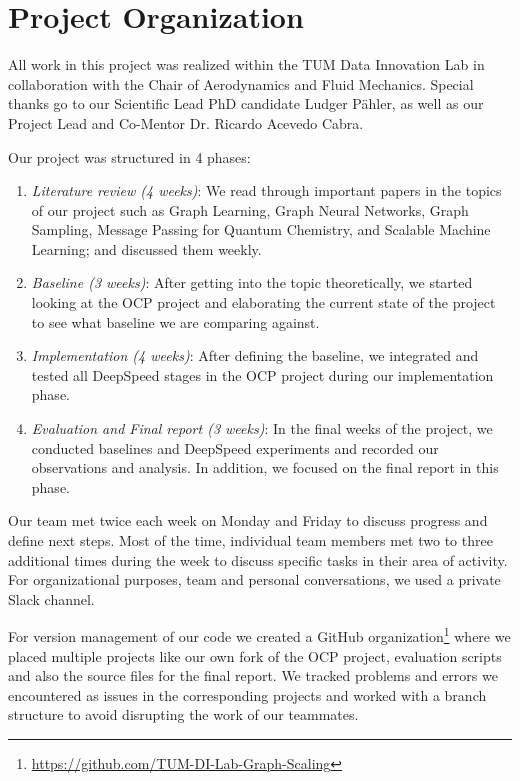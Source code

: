 \section{Project Organization}
\label{section:project_organization}

All work in this project was realized within the TUM Data Innovation Lab in collaboration with the Chair of 
Aerodynamics and Fluid Mechanics. Special thanks go to our Scientific Lead PhD candidate Ludger P\"ahler, 
as well as our Project Lead and Co-Mentor Dr. Ricardo Acevedo Cabra.

Our project was structured in 4 phases:

\begin{enumerate}
    \item \textit{Literature review (4 weeks)}: We read through important papers in the topics of our project such 
    as Graph Learning, Graph Neural Networks, Graph Sampling, Message Passing for Quantum Chemistry, 
    and Scalable Machine Learning; and discussed them weekly.
    \item \textit{Baseline (3 weeks)}: After getting into the topic theoretically, we started looking at the OCP 
    project and elaborating the current state of the project to see what baseline we are comparing against.
    \item \textit{Implementation (4 weeks)}: After defining the baseline, we integrated and tested all DeepSpeed 
    stages in the OCP project during our implementation phase.
    \item \textit{Evaluation and Final report (3 weeks)}: In the final weeks of the project, we conducted baselines 
    and DeepSpeed experiments and recorded our observations and analysis. In addition, we focused on the final 
    report in this phase.
\end{enumerate}

Our team met twice each week on Monday and Friday to discuss progress and define next steps. Most of 
the time, individual team members met two to three additional times during the week to discuss specific 
tasks in their area of activity. For organizational purposes, team and personal conversations, we used 
a private Slack channel.

For version management of our code we created a GitHub organization\footnote{\url{https://github.com/TUM-DI-Lab-Graph-Scaling}} 
where we placed multiple projects like our own fork of the OCP project, evaluation scripts and also 
the source files for the final report. We tracked problems and errors we encountered as issues in the 
corresponding projects and worked with a branch structure to avoid disrupting the work of our teammates.